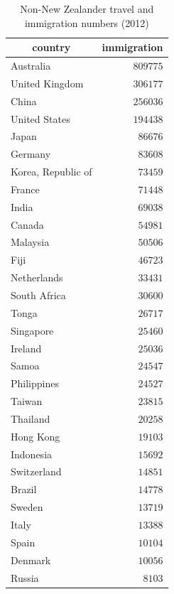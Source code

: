 \documentclass{article}
\begin{document}
\begin{itemize}
\begin{table}
\caption{Non-New Zealander travel and immigration numbers (2012)}
\begin{center}
\begin{tabular}{lr}
\hline\hline
\multicolumn{1}{c}{country}&\multicolumn{1}{c}{immigration}\tabularnewline
\hline
Australia&$809775$\tabularnewline
United Kingdom&$306177$\tabularnewline
China&$256036$\tabularnewline
United States&$194438$\tabularnewline
Japan&$ 86676$\tabularnewline
Germany&$ 83608$\tabularnewline
Korea, Republic of&$ 73459$\tabularnewline
France&$ 71448$\tabularnewline
India&$ 69038$\tabularnewline
Canada&$ 54981$\tabularnewline
Malaysia&$ 50506$\tabularnewline
Fiji&$ 46723$\tabularnewline
Netherlands&$ 33431$\tabularnewline
South Africa&$ 30600$\tabularnewline
Tonga&$ 26717$\tabularnewline
Singapore&$ 25460$\tabularnewline
Ireland&$ 25036$\tabularnewline
Samoa&$ 24547$\tabularnewline
Philippines&$ 24527$\tabularnewline
Taiwan&$ 23815$\tabularnewline
Thailand&$ 20258$\tabularnewline
Hong Kong&$ 19103$\tabularnewline
Indonesia&$ 15692$\tabularnewline
Switzerland&$ 14851$\tabularnewline
Brazil&$ 14778$\tabularnewline
Sweden&$ 13719$\tabularnewline
Italy&$ 13388$\tabularnewline
Spain&$ 10104$\tabularnewline
Denmark&$ 10056$\tabularnewline
Russia&$  8103$\tabularnewline
\hline
\end{tabular}\end{center}\label{table:imtravel12}
\end{table}



\end{itemize}
\end{document}
